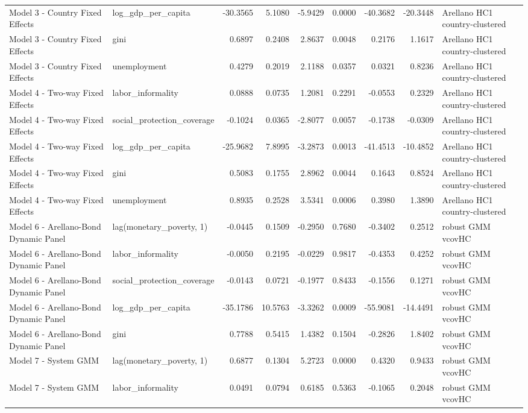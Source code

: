 \begin{tabular}{llrrrrrrl}
Model 3 - Country Fixed Effects & log\_gdp\_per\_capita & -30.3565 & 5.1080 & -5.9429 & 0.0000 & -40.3682 & -20.3448 & Arellano HC1 country-clustered\\
\addlinespace
Model 3 - Country Fixed Effects & gini & 0.6897 & 0.2408 & 2.8637 & 0.0048 & 0.2176 & 1.1617 & Arellano HC1 country-clustered\\
Model 3 - Country Fixed Effects & unemployment & 0.4279 & 0.2019 & 2.1188 & 0.0357 & 0.0321 & 0.8236 & Arellano HC1 country-clustered\\
Model 4 - Two-way Fixed Effects & labor\_informality & 0.0888 & 0.0735 & 1.2081 & 0.2291 & -0.0553 & 0.2329 & Arellano HC1 country-clustered\\
Model 4 - Two-way Fixed Effects & social\_protection\_coverage & -0.1024 & 0.0365 & -2.8077 & 0.0057 & -0.1738 & -0.0309 & Arellano HC1 country-clustered\\
Model 4 - Two-way Fixed Effects & log\_gdp\_per\_capita & -25.9682 & 7.8995 & -3.2873 & 0.0013 & -41.4513 & -10.4852 & Arellano HC1 country-clustered\\
\addlinespace
Model 4 - Two-way Fixed Effects & gini & 0.5083 & 0.1755 & 2.8962 & 0.0044 & 0.1643 & 0.8524 & Arellano HC1 country-clustered\\
Model 4 - Two-way Fixed Effects & unemployment & 0.8935 & 0.2528 & 3.5341 & 0.0006 & 0.3980 & 1.3890 & Arellano HC1 country-clustered\\
Model 6 - Arellano-Bond Dynamic Panel & lag(monetary\_poverty, 1) & -0.0445 & 0.1509 & -0.2950 & 0.7680 & -0.3402 & 0.2512 & robust GMM vcovHC\\
Model 6 - Arellano-Bond Dynamic Panel & labor\_informality & -0.0050 & 0.2195 & -0.0229 & 0.9817 & -0.4353 & 0.4252 & robust GMM vcovHC\\
Model 6 - Arellano-Bond Dynamic Panel & social\_protection\_coverage & -0.0143 & 0.0721 & -0.1977 & 0.8433 & -0.1556 & 0.1271 & robust GMM vcovHC\\
\addlinespace
Model 6 - Arellano-Bond Dynamic Panel & log\_gdp\_per\_capita & -35.1786 & 10.5763 & -3.3262 & 0.0009 & -55.9081 & -14.4491 & robust GMM vcovHC\\
Model 6 - Arellano-Bond Dynamic Panel & gini & 0.7788 & 0.5415 & 1.4382 & 0.1504 & -0.2826 & 1.8402 & robust GMM vcovHC\\
Model 7 - System GMM & lag(monetary\_poverty, 1) & 0.6877 & 0.1304 & 5.2723 & 0.0000 & 0.4320 & 0.9433 & robust GMM vcovHC\\
Model 7 - System GMM & labor\_informality & 0.0491 & 0.0794 & 0.6185 & 0.5363 & -0.1065 & 0.2048 & robust GMM vcovHC\\

\end{tabular}

